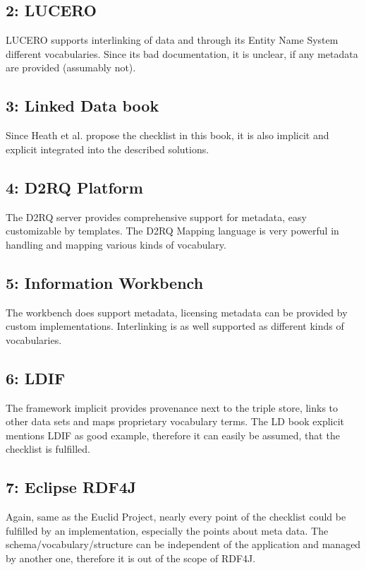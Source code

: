 \subsection*{2: LUCERO}
LUCERO supports interlinking of data and through its Entity Name System different vocabularies. Since its bad documentation, it is unclear, if any metadata are provided (assumably not).

\subsection*{3: Linked Data book}
Since Heath et al. propose the checklist in this book, it is also implicit and explicit integrated into the described solutions.

\subsection*{4: D2RQ Platform}
The D2RQ server provides comprehensive support for metadata, easy customizable by templates. The D2RQ Mapping language is very powerful in handling and mapping various kinds of vocabulary.

\subsection*{5: Information Workbench}
The workbench does support metadata, licensing metadata can be provided by custom implementations. Interlinking is as well supported as different kinds of vocabularies.

\subsection*{6: LDIF}
The framework implicit provides provenance next to the triple store, links to other data sets and maps proprietary vocabulary terms. The LD book explicit mentions LDIF as good example, therefore it can easily be assumed, that the checklist is fulfilled.

\subsection*{7: Eclipse RDF4J}
Again, same as the Euclid Project, nearly every point of the checklist could be fulfilled by an implementation, especially the points about meta data. The schema/vocabulary/structure can be independent of the application and managed by another one, therefore it is out of the scope of RDF4J.

